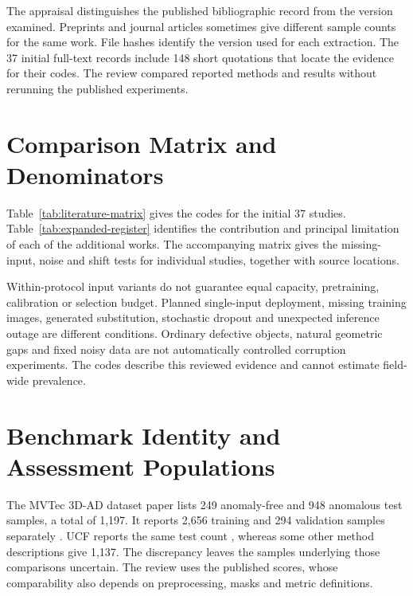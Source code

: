 The appraisal distinguishes the published bibliographic record from the version
examined. Preprints and journal articles sometimes give different sample counts for the
same work. File hashes identify the version used for each extraction. The 37 initial
full-text records include 148 short quotations that locate the evidence for their codes.
The review compared reported methods and results without rerunning the published
experiments.

\section{Comparison Matrix and Denominators}
Table~\ref{tab:literature-matrix} gives the codes for the initial 37 studies.
Table~\ref{tab:expanded-register} identifies the contribution and principal limitation
of each of the \ExpandedPDFCount{} additional works. The accompanying matrix gives the missing-input,
noise and shift tests for individual studies, together with source locations.

Within-protocol input variants do not guarantee equal capacity, pretraining, calibration
or selection budget. Planned single-input deployment, missing training images, generated
substitution, stochastic dropout and unexpected inference outage are different
conditions. Ordinary defective objects, natural geometric gaps and fixed noisy data are
not automatically controlled corruption experiments. The codes describe this reviewed
evidence and cannot estimate field-wide prevalence.





\section{Benchmark Identity and Assessment Populations}
The MVTec 3D-AD dataset paper lists 249 anomaly-free and 948 anomalous test samples, a
total of 1,197. It reports 2,656 training and 294 validation samples separately
\parencite[Table~1, PDF p.~4]{Bergmann2022The}. UCF reports the same test count
\parencite{Cheng2025Multimodal}, whereas some other method descriptions give 1,137. The
discrepancy leaves the samples underlying those comparisons uncertain. The review uses
the published scores, whose comparability also depends on preprocessing, masks and
metric definitions.
